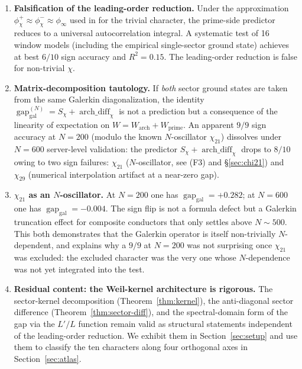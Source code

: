 \documentclass[a4paper,10pt,twocolumn]{article}
\theoremstyle{definition}
\theoremstyle{remark}
\newcommand{\gap}{\operatorname{gap}}
\newcommand{\chifn}{\chi}
\newcommand{\archdiff}{\operatorname{arch\_diff}}
\begin{document}
\begin{enumerate}
\item[(F1)] \textbf{Falsification of the leading-order reduction.}
  Under the approximation
  $\phi^+_{\chifn}\approx\phi^-_{\chifn}\approx\phi_\infty$ used in
  \cite{RH_II} for the trivial character, the prime-side predictor
  reduces to a universal autocorrelation integral. A systematic test
  of 16 window models (including the empirical single-sector ground
  state) achieves at best $6/10$ sign accuracy and $R^2=0.15$.
  The leading-order reduction is false for non-trivial $\chi$.
\item[(F2)] \textbf{Matrix-decomposition tautology.}
  If \emph{both} sector ground states are taken from the same
  Galerkin diagonalization, the identity
  $\gap_{\mathrm{gal}}^{(N)} = S_{\chifn}+\archdiff_{\chifn}$
  is not a prediction but a consequence of the linearity of
  expectation on $W=W_{\mathrm{arch}}+W_{\mathrm{prime}}$. An apparent
  $9/9$ sign accuracy at $N=200$ (modulo the known $N$-oscillator
  $\chi_{21}$) dissolves under $N=600$ server-level validation: the
  predictor $S_{\chifn}+\archdiff_{\chifn}$ drops to $8/10$ owing
  to two sign failures: $\chi_{21}$ ($N$-oscillator,
  see (F3) and \S\ref{sec:chi21}) and $\chi_{29}$ (numerical
  interpolation artifact at a near-zero gap).
\item[(F3)] \textbf{$\chi_{21}$ as an $N$-oscillator.}
  At $N=200$ one has $\gap_{\mathrm{gal}}=+0.282$; at $N=600$ one has
  $\gap_{\mathrm{gal}}=-0.004$. The sign flip is not a formula defect
  but a Galerkin truncation effect for composite conductors that only
  settles above $N\sim 500$. This both demonstrates that the Galerkin
  operator is itself non-trivially $N$-dependent, and explains why a
  $9/9$ at $N=200$ was not surprising once $\chi_{21}$ was excluded:
  the excluded character was the very one whose $N$-dependence was not
  yet integrated into the test.
\item[(F4)] \textbf{Residual content: the Weil-kernel architecture is
  rigorous.} The sector-kernel decomposition
  (Theorem~\ref{thm:kernel}), the anti-diagonal sector difference
  (Theorem~\ref{thm:sector-diff}), and the spectral-domain form of the
  gap via the $L'/L$ function remain valid as structural statements
  independent of the leading-order reduction. We exhibit them in
  Section~\ref{sec:setup} and use them to classify the ten characters
  along four orthogonal axes in Section~\ref{sec:atlas}.
\end{enumerate}
\end{document}
